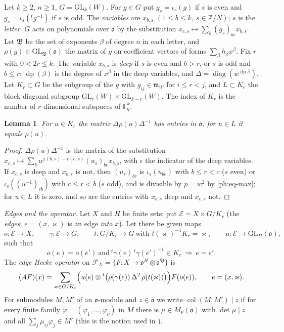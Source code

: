 \documentclass[10pt]{amsart}
\newtheorem{lemma}[theorem]{Lemma}
\theoremstyle{definition}
\theoremstyle{remark}
\newcommand{\Z}{\mathbb Z}
\providecommand{\auF}{\mathbb F}
\providecommand{\auGL}{\mathrm{GL}}
\providecommand{\aucol}{\operatorname{col}}
\providecommand{\pam}{\mathfrak m}
\providecommand{\pao}{\mathfrak o}
\providecommand{\phB}{\mathfrak B}
\providecommand{\phdep}{\operatorname{dp}}
\begin{document}
Let $k\ge2$, $n\ge1$, $G=\auGL_k(W)$. For $g\in G$ put $g_s=\iota_s(g)$ if $s$ is even and
$g_s=\iota_s({}^tg^{-1})$ if $s$ is odd. The \emph{variables} are $x_{b,s}$ $(1\le b\le k,\
s\in\Z/N)$; $s$ is the \emph{letter}. $G$ acts on polynomials over $\pao$ by the substitution
$x_{c,s}\mapsto\sum_b(g_s)_{bc}x_{b,s}$. Let $\phB$ be the set of exponents $\beta$ of degree $n$
in each letter, and $\rho(g)\in\auGL_\phB(\pao)$ the matrix of $g$ on coefficient vectors of forms
$\sum_\beta h_\beta x^\beta$. Fix $r$ with $0<2r\le k$. The variable $x_{b,s}$ is \emph{deep} if
$s$ is even and $b>r$, or $s$ is odd and $b\le r$; $\phdep(\beta)$ is the degree of $x^\beta$ in
the deep variables, and $\Delta=\operatorname{diag}(w^{\phdep\beta})$. Let $K_r\subset G$ be the
subgroup of the $g$ with $g_{ij}\in\pam_W$ for $i\le r<j$, and $L\subset K_r$ the block diagonal
subgroup $\auGL_r(W)\times\auGL_{k-r}(W)$. The index of $K_r$ is the number of $r$-dimensional
subspaces of $\auF_q^k$.

\begin{lemma}\label{ph:para}
For $u\in K_r$ the matrix $\Delta\rho(u)\Delta^{-1}$ has entries in $\pao$; for $u\in L$ it equals
$\rho(u)$.
\end{lemma}
\begin{proof}
$\Delta\rho(u)\Delta^{-1}$ is the matrix of the substitution $x_{c,s}\mapsto\sum_bw^{\epsilon(b,s)
-\epsilon(c,s)}(u_s)_{bc}x_{b,s}$, with $\epsilon$ the indicator of the deep variables. If
$x_{c,s}$ is deep and $x_{b,s}$ is not, then $(u_s)_{bc}$ is $\iota_s(u_{bc})$ with $b\le r<c$ ($s$
even) or $\iota_s((u^{-1})_{cb})$ with $c\le r<b$ ($s$ odd), and is divisible by $p=w^2$ by
\eqref{ph:eq-max}; for $u\in L$ it is zero, and so are the entries with $x_{b,s}$ deep and
$x_{c,s}$ not.
\end{proof}

\emph{Edges and the operator.} Let $X$ and $H$ be finite sets; put $\mathcal E=X\times G/K_r$ (the
\emph{edges}; $e=(x,\varkappa)$ is an edge \emph{into} $x$). Let there be given maps
\[
o\colon\mathcal E\to X,\qquad\gamma\colon\mathcal E\to G,\qquad t\colon G/K_r\to G\ \text{with }
t(\varkappa)^{-1}K_r=\varkappa,\qquad u\colon\mathcal E\to\auGL_H(\pao),
\]
such that
\begin{equation}\label{ph:eq-free}
o(e)=o(e')\ \text{and}\ {}^t\gamma(e)\,{}^t\gamma(e')^{-1}\in K_r\ \Longrightarrow\ e=e'.
\end{equation}
The \emph{edge Hecke operator} on $\mathcal F_X=\{F\colon X\to\pao^H\otimes\pao^\phB\}$ is
\begin{equation}\label{ph:eq-A}
(AF)(x)=\sum_{\varkappa\in G/K_r}\Bigl(u(e)\otimes{}^t\bigl(\rho(\gamma(e))\,\Delta^2\,\rho(t(
\varkappa))\bigr)\Bigr)F(o(e)),\qquad e=(x,\varkappa).
\end{equation}
For submodules $M,M'$ of an $\pao$-module and $z\in\pao$ we write $\aucol(M,M')\mid z$ if for every
finite family $\varphi=(\varphi_1,\dots,\varphi_\nu)$ in $M$ there is $\mu\in M_\nu(\pao)$ with
$\det\mu\mid z$ and all $\sum_j\mu_{ij}\varphi_j\in M'$ (this is the notion used in
{\cite[Theorem~4.21]{P49}}).
\end{document}
